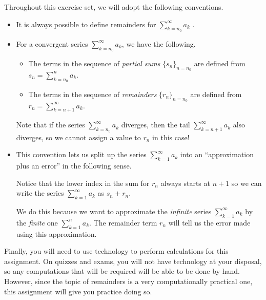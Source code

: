 \documentclass{ximera}
\author{Jim Talamo}
\begin{document}
\begin{exercise}
Throughout this exercise set, we will adopt the following conventions.

\begin{itemize}
\item It is always possible to define remainders for $\sum_{k=n_0}^{\infty} a_k$  . 
\item For a convergent series $\sum_{k=n_0}^{\infty} a_k$, we have the following.

\begin{itemize}
\item The terms in the sequence of \emph{partial sums} $\{s_n\}_{n=n_0}$ are defined from $s_n = \sum_{k=n_0}^n a_k.$
\item  The terms in the sequence of \emph{remainders} $\{r_n\}_{n=n_0}$ are defined from $r_n = \sum_{k=n+1}^\infty a_k.$
\end{itemize}

Note that if the series $\sum_{k=n_0}^{\infty} a_k$ diverges, then the tail $\sum_{k=n+1}^{\infty} a_k$ also diverges, so we cannot assign a value to $r_n$ in this case!

\item This convention lets us split up the series $\sum_{k=1}^{\infty} a_k$ into an ``approximation plus an error'' in the following sense.

\begin{image}
  \end{image}
  
Notice that the lower index in the sum for $r_n$ always starts at $n+1$ so we can write the series $ \sum_{k=1}^{\infty} a_k$ as $s_n +r_n$.
  
  We do this because we want to approximate the \emph{infinite} series $\sum_{k=1}^{\infty} a_k$ by the \emph{finite} one $ \sum_{k=1}^{n} a_k$.  The remainder term $r_n$ will tell us the error made using this approximation.

\end{itemize}

Finally, you will need to use technology to perform calculations for this assignment.  On quizzes and exams, you will not have technology at your disposal, so any computations that will be required will be able to be done by hand.  However, since the topic of remainders is a very computationally practical one, this assignment will give you practice doing so. 
\end{exercise}
\end{document}
